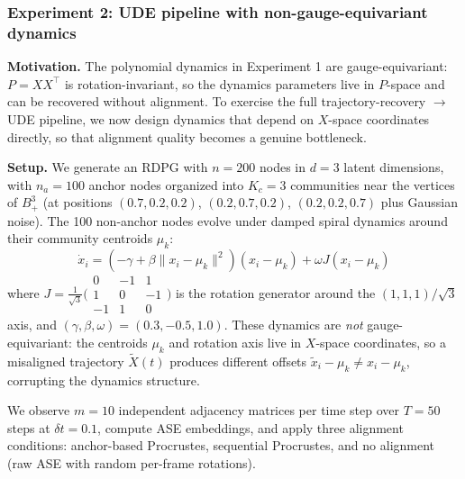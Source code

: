 \documentclass{article}
\theoremstyle{plain}
\theoremstyle{definition}
\theoremstyle{remark}
\begin{document}
\subsubsection{Experiment 2: UDE pipeline with non-gauge-equivariant dynamics}\label{sec:numerics-ude}

\textbf{Motivation.}
The polynomial dynamics in Experiment 1 are gauge-equivariant: $P = XX^\top$ is rotation-invariant, so the dynamics parameters live in $P$-space and can be recovered without alignment.
To exercise the full trajectory-recovery $\to$ UDE pipeline, we now design dynamics that depend on $X$-space coordinates directly, so that alignment quality becomes a genuine bottleneck.

\textbf{Setup.}
We generate an RDPG with $n = 200$ nodes in $d = 3$ latent dimensions, with $n_a = 100$ anchor nodes organized into $K_c = 3$ communities near the vertices of $B_+^3$ (at positions $(0.7, 0.2, 0.2)$, $(0.2, 0.7, 0.2)$, $(0.2, 0.2, 0.7)$ plus Gaussian noise).
The 100 non-anchor nodes evolve under damped spiral dynamics around their community centroids $\mu_k$:
\begin{equation}
\dot{x}_i = (-\gamma + \beta \|x_i - \mu_k\|^2)(x_i - \mu_k) + \omega J(x_i - \mu_k)
\end{equation}
where $J = \frac{1}{\sqrt{3}} \bigl(\begin{smallmatrix} 0 & -1 & 1 \\ 1 & 0 & -1 \\ -1 & 1 & 0 \end{smallmatrix}\bigr)$ is the rotation generator around the $(1,1,1)/\sqrt{3}$ axis, and $(\gamma, \beta, \omega) = (0.3, -0.5, 1.0)$.
These dynamics are \emph{not} gauge-equivariant: the centroids $\mu_k$ and rotation axis live in $X$-space coordinates, so a misaligned trajectory $\tilde{X}(t)$ produces different offsets $\tilde{x}_i - \mu_k \neq x_i - \mu_k$, corrupting the dynamics structure.

We observe $m = 10$ independent adjacency matrices per time step over $T = 50$ steps at $\delta t = 0.1$, compute ASE embeddings, and apply three alignment conditions: anchor-based Procrustes, sequential Procrustes, and no alignment (raw ASE with random per-frame rotations).
\end{document}
